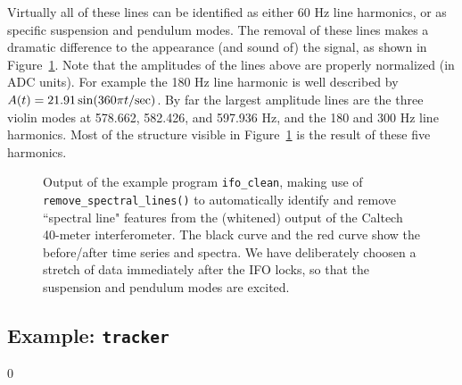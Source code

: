 Virtually all of these lines can be identified as either 60 Hz line
harmonics, or as specific suspension and pendulum modes.  The removal of
these lines makes a dramatic difference to the appearance (and sound of)
the signal, as shown in Figure~\ref{f:ifoclean}.  Note that the amplitudes
of the lines above are properly normalized (in ADC units).  For example
the 180 Hz line harmonic is well described by $A(t) = 21.91 \sin(360
\pi t/{\rm sec})$.  By far the largest amplitude lines are the three
violin modes at 578.662, 582.426, and 597.936 Hz, and the 180 and 300 Hz
line harmonics.  Most of the structure visible in Figure~\ref{f:ifoclean}
is the result of these five harmonics.
\begin{figure}[hb]
\begin{center}
\caption{ \label{f:ifoclean} 
Output of the example program {\tt ifo\_clean}, making use of {\tt
remove\_spectral\_lines()} to automatically identify and remove
``spectral line" features from the (whitened) output of the Caltech
40-meter interferometer.  The black curve and the red curve show the
before/after time series and spectra.  We have deliberately choosen a
stretch of data immediately after the IFO locks, so that the suspension
and pendulum modes are excited.
}
\end{center}
\end{figure}

\clearpage

\subsection{Example: {\tt tracker} }
\setcounter{equation}0

